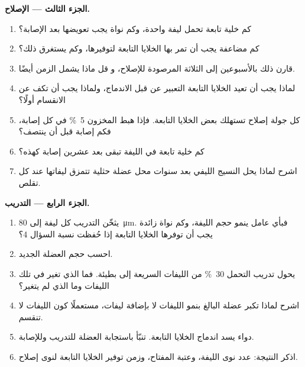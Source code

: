 \begin{problem}
\medskip
\noindent\textbf{الجزء الثالث --- الإصلاح.}
\begin{enumerate}[resume]
  \item كم خلية تابعة تحمل ليفة واحدة، وكم نواة
        يجب تعويضها بعد الإصابة؟
  \item كم مضاعفة يجب أن تمر بها الخلايا التابعة
        لتوفيرها، وكم يستغرق ذلك؟
  \item قارن ذلك بالأسبوعين إلى الثلاثة المرصودة للإصلاح، و
        قل ماذا يشمل الزمن أيضًا.
  \item لماذا يجب أن تعيد الخلايا التابعة التعبير عن  قبل الاندماج،
        ولماذا يجب أن تكف عن الانقسام أولًا؟
  \item كل جولة إصلاح تستهلك بعض الخلايا التابعة. فإذا هبط
        المخزون \qty{5}{\%} في كل إصابة، فكم إصابة
        قبل أن ينتصف؟
  \item كم خلية تابعة في الليفة تبقى بعد عشرين إصابة
        كهذه؟
  \item اشرح لماذا يحل النسيج الليفي بعد سنوات محل عضلة
        حثلية تتمزق ليفاتها عند كل تقلص.
\end{enumerate}

\medskip
\noindent\textbf{الجزء الرابع --- التدريب.}
\begin{enumerate}[resume]
  \item يثخّن التدريب كل ليفة إلى \qty{80}{\micro m}. فبأي
        عامل ينمو حجم الليفة، وكم نواة زائدة
        يجب أن توفرها الخلايا التابعة إذا حُفظت نسبة
        السؤال 4؟
  \item احسب حجم العضلة الجديد.
  \item يحول تدريب التحمل \qty{30}{\%} من الليفات السريعة
        إلى بطيئة. فما الذي تغير في تلك الليفات وما الذي لم يتغير؟
  \item اشرح لماذا تكبر عضلة البالغ بنمو الليفات
        لا بإضافة ليفات، مستعملًا كون الليفات
        لا تنقسم.
  \item دواء يسد اندماج الخلايا التابعة. تنبّأ
        باستجابة العضلة للتدريب وللإصابة.
  \item اذكر النتيجة: عدد نوى الليفة، وعتبة
        المفتاح، وزمن توفير الخلايا التابعة لنوى إصلاح.
\end{enumerate}
\end{problem}
